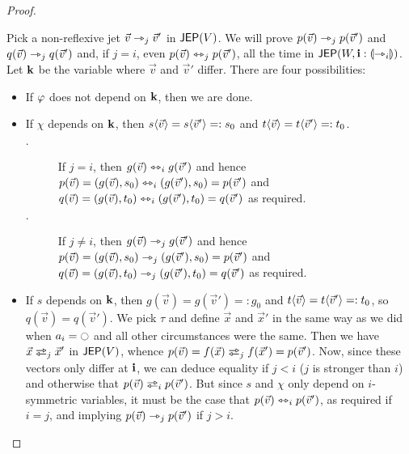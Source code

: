 \documentclass[a4paper]{memoir}
\begin{document}
\begin{proof}
\begin{itemize}
\begin{itemize}
\begin{itemize}
				Pick a non-reflexive jet $\vec v \rightarrowtriangle_j \vec v'$ in $\mathsf{JEP}(V)$.
				We will prove $p(\vec v) \rightarrowtriangle_j p(\vec v')$ and $q(\vec v) \rightarrowtriangle_j q(\vec v')$ and, if $j = i$, even $p(\vec v) \leftrightarrowtriangle_j p(\vec v')$, all the time in $\mathsf{JEP}(W, \mathbf{i} : {\llparenthesis \rightarrowtriangle_i \rrparenthesis})$.
				Let $\mathbf{k}$ be the variable where $\vec v$ and $\vec v'$ differ.
				There are four possibilities:
				\begin{itemize}
					\item If $\varphi$ does not depend on $\mathbf{k}$, then we are done.
					\item If $\chi$ depends on $\mathbf{k}$, then $s \langle \vec v \rangle = s \langle \vec v' \rangle =: s_0$ and $t \langle \vec v \rangle = t \langle \vec v' \rangle =: t_0$.
					\begin{description}
						\item[$\cdot$] If $j = i$, then $g(\vec v) \leftrightarrowtriangle_i g(\vec v')$ and hence $p(\vec v) = (g(\vec v), s_0) \leftrightarrowtriangle_i (g(\vec v'), s_0) = p(\vec v')$ and $q(\vec v) = (g(\vec v), t_0) \leftrightarrowtriangle_i (g(\vec v'), t_0) = q(\vec v')$ as required.
						\item[$\cdot$] If $j \neq i$, then $g(\vec v) \rightarrowtriangle_j g(\vec v')$ and hence $p(\vec v) = (g(\vec v), s_0) \rightarrowtriangle_j (g(\vec v'), s_0) = p(\vec v')$ and $q(\vec v) = (g(\vec v), t_0) \rightarrowtriangle_j (g(\vec v'), t_0) = q(\vec v')$ as required.
					\end{description}
					\item If $s$ depends on $\mathbf{k}$, then $g(\vec v) = g(\vec v') =: g_0$ and $t \langle \vec v \rangle = t \langle \vec v' \rangle =: t_0$, so $q(\vec v) = q(\vec v')$.
					We pick $\tau$ and define $\vec x$ and $\vec x'$ in the same way as we did when $a_i = \npolar$ and all other circumstances were the same.
					Then we have $\vec x \infrajet_j \vec x'$ in $\mathsf{JEP}(V)$, whence $p(\vec v) = f(\vec x) \infrajet_j f(\vec x') = p(\vec v')$.
					Now, since these vectors only differ at $\mathbf{i}$, we can deduce equality if $j < i$ ($j$ is stronger than $i$) and otherwise that $p(\vec v) \infrajet_i p(\vec v')$.
					But since $s$ and $\chi$ only depend on $i$-symmetric variables, it must be the case that $p(\vec v) \leftrightarrowtriangle_i p(\vec v')$, as required if $i = j$, and implying $p(\vec v) \rightarrowtriangle_j p(\vec v')$ if $j > i$.
					

\end{itemize}
\end{itemize}
\end{itemize}
\end{itemize}
\end{proof}
\end{document}
